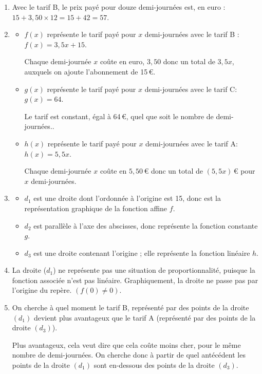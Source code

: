 \begin{enumerate}
	\item Avec le tarif B, le prix payé pour douze demi-journées est, en euro : \quad $15 + 3,50\times 12 = 15 + 42 = 57$.
	\item \begin{itemize}
		\item  $f(x)$ représente le tarif payé pour $x$ demi-journées avec le tarif B : $f(x) = 3,5x + 15.$

Chaque demi-journée $x$ coûte en euro, $3,50$ donc un total de $3,5x$, auxquels on ajoute l'abonnement de 15\,\euro{}.

	\item $g(x)$ représente le tarif payé pour $x$ demi-journées avec le tarif C: $g(x) = 64$.

Le tarif est constant, égal à 64\,\euro{}, quel que soit le nombre de demi-journées..

	\item $h(x)$ représente le tarif payé pour $x$ demi-journées avec le tarif A: $h(x)=5,5x$.

Chaque demi-journée $x$ coûte en $5,50\,\euro$ donc un total de $(5,5x)$\,\euro{} pour $x$ demi-journées.
	\end{itemize}


	\item \begin{itemize}
		\item  $d_1$ est une droite dont l'ordonnée à l'origine est 15, donc est la représentation graphique de la fonction affine $f$.
		\item $d_2$ est parallèle à l'axe des abscisses, donc représente la fonction constante $g$.
		\item $d_3$ est une droite contenant l'origine ; elle représente la fonction linéaire $h$.
	\end{itemize}
	\item La droite ($d_1$) ne représente pas une situation de proportionnalité, puisque la fonction associée n'est pas linéaire. Graphiquement, la droite ne passe pas par l'origine du repère. $(f(0) \ne 0)$.
	\item On cherche à quel moment le tarif B, représenté par des points de la droite $(d_1)$ devient plus avantageux que le tarif A (représenté par des points de la droite $(d_3)$).

Plus avantageux, cela veut dire que cela coûte moins cher, pour le même nombre de demi-journées. On cherche donc à partir de quel antécédent les points de la droite $(d_1)$ sont  en-dessous des points de  la droite $(d_3)$.


\end{enumerate}
